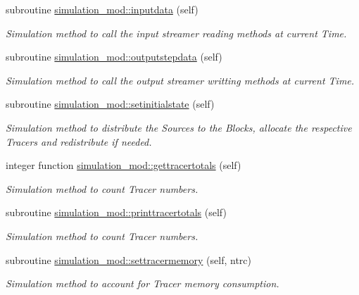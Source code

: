 \begin{DoxyCompactItemize}
subroutine \mbox{\hyperlink{namespacesimulation__mod_a629f51ee8ca4d2ece7f039a0114b1ef4}{simulation\+\_\+mod\+::inputdata}} (self)
\begin{DoxyCompactList}\small\item\em Simulation method to call the input streamer reading methods at current Time. \end{DoxyCompactList}\item 
subroutine \mbox{\hyperlink{namespacesimulation__mod_a5735e9ecb39f15061f3d766b0de7809d}{simulation\+\_\+mod\+::outputstepdata}} (self)
\begin{DoxyCompactList}\small\item\em Simulation method to call the output streamer writting methods at current Time. \end{DoxyCompactList}\item 
subroutine \mbox{\hyperlink{namespacesimulation__mod_a447c6d709de6aa360a65d39d660e627b}{simulation\+\_\+mod\+::setinitialstate}} (self)
\begin{DoxyCompactList}\small\item\em Simulation method to distribute the Sources to the Blocks, allocate the respective Tracers and redistribute if needed. \end{DoxyCompactList}\item 
integer function \mbox{\hyperlink{namespacesimulation__mod_a0ad485eab624ffa4df282f1da8d9f214}{simulation\+\_\+mod\+::gettracertotals}} (self)
\begin{DoxyCompactList}\small\item\em Simulation method to count Tracer numbers. \end{DoxyCompactList}\item 
subroutine \mbox{\hyperlink{namespacesimulation__mod_aba126a8e0575cabb3bef6ab395002b3c}{simulation\+\_\+mod\+::printtracertotals}} (self)
\begin{DoxyCompactList}\small\item\em Simulation method to count Tracer numbers. \end{DoxyCompactList}\item 
subroutine \mbox{\hyperlink{namespacesimulation__mod_acc5fa823c8dd599de8feda8988c224f2}{simulation\+\_\+mod\+::settracermemory}} (self, ntrc)
\begin{DoxyCompactList}\small\item\em Simulation method to account for Tracer memory consumption. \end{DoxyCompactList}\item 

\end{DoxyCompactItemize}
